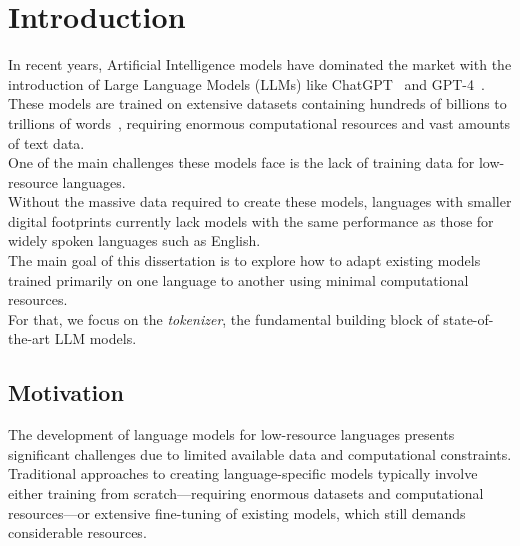 
\chapter{Introduction}


\label{Section1}

In recent years, Artificial Intelligence models have dominated the market with the introduction of Large Language Models (LLMs) like ChatGPT~\cite{Chat-GPT} and GPT-4~\cite{openai2023gpt4}.\\
These models are trained on extensive datasets containing hundreds of billions to trillions of words~\cite{brown2020language, touvron2023llama}, requiring enormous computational resources and vast amounts of text data.\\
One of the main challenges these models face is the lack of training data for low-resource languages.\\
Without the massive data required to create these models, languages with smaller digital footprints currently lack models with the same performance as those for widely spoken languages such as English.\\
The main goal of this dissertation is to explore how to adapt existing models trained primarily on one language to another using minimal computational resources.\\
For that, we focus on the \textit{tokenizer}, the fundamental building block of state-of-the-art LLM models.

\section{Motivation}\label{Section1.1}
The development of language models for low-resource languages presents significant challenges due to limited available data and computational constraints. Traditional approaches to creating language-specific models typically involve either training from scratch—requiring enormous datasets and computational resources—or extensive fine-tuning of existing models, which still demands considerable resources.

